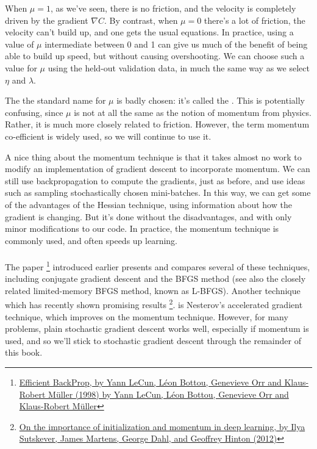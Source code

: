 When $\mu=1$, as we've seen, there is no friction, and the velocity is completely driven by the gradient $\nabla C$. By contrast, when $\mu=0$ there's a lot of friction, the velocity can't build up, and one gets the usual equations. In practice, using a value of $\mu$ intermediate between $0$ and 1 can give us much of the benefit of being able to build up speed, but without causing overshooting. We can choose such a value for $\mu$ using the held-out validation data, in much the same way as we select $\eta$ and $\lambda$.

The the standard name for $\mu$ is badly chosen: it's called the . This is potentially confusing, since $\mu$ is not at all the same as the notion of momentum from physics. Rather, it is much more closely related to friction. However, the term momentum co-efficient is widely used, so we will continue to use it.

A nice thing about the momentum technique is that it takes almost no work to modify an implementation of gradient descent to incorporate momentum. We can still use backpropagation to compute the gradients, just as before, and use ideas such as sampling stochastically chosen mini-batches. In this way, we can get some of the advantages of the Hessian technique, using information about how the gradient is changing. But it's done without the disadvantages, and with only minor modifications to our code. In practice, the momentum technique is commonly used, and often speeds up learning.

\paragraph{}
The paper \footnote{\href{http://yann.lecun.com/exdb/publis/pdf/lecun-98b.pdf}{Efficient BackProp, by Yann LeCun, Léon Bottou, Genevieve Orr and Klaus-Robert Müller (1998) by Yann LeCun, Léon Bottou, Genevieve Orr and Klaus-Robert Müller}} introduced earlier presents and compares several of these techniques, including conjugate gradient descent and the BFGS method (see also the closely related limited-memory BFGS method, known as L-BFGS). Another technique which has recently shown promising results \footnote{\href{http://www.cs.toronto.edu/~hinton/absps/momentum.pdf}{On the importance of initialization and momentum in deep learning, by Ilya Sutskever, James Martens, George Dahl, and Geoffrey Hinton (2012)}}. is Nesterov's accelerated gradient technique, which improves on the momentum technique. However, for many problems, plain stochastic gradient descent works well, especially if momentum is used, and so we'll stick to stochastic gradient descent through the remainder of this book.

